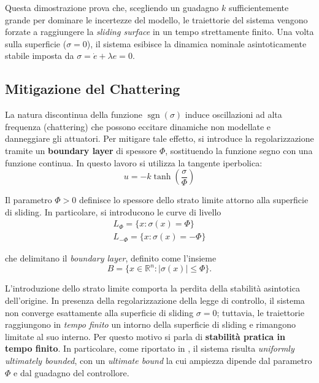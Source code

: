 Questa dimostrazione prova che, scegliendo un guadagno $k$ sufficientemente grande per dominare le incertezze del modello, le traiettorie del sistema vengono forzate a raggiungere la \textit{sliding surface} in un tempo strettamente finito. Una volta sulla superficie ($\sigma=0$), il sistema esibisce la dinamica nominale asintoticamente stabile imposta da $\sigma = \dot{e} + \lambda e = 0$.

\subsection{Mitigazione del Chattering}

La natura discontinua della funzione $\operatorname{sgn}(\sigma)$ induce oscillazioni ad alta frequenza (chattering) che possono eccitare dinamiche non modellate e danneggiare gli attuatori. Per mitigare tale effetto, si introduce la regolarizzazione tramite un \textbf{boundary layer} di spessore $\Phi$, sostituendo la funzione segno con una funzione continua. In questo lavoro si utilizza la tangente iperbolica:
\begin{equation}
u = -k \tanh\left(\frac{\sigma}{\Phi}\right)
\end{equation}

Il parametro $\Phi>0$ definisce lo spessore dello strato limite attorno alla superficie di sliding. In particolare, si introducono le curve di livello
\begin{equation}
\begin{matrix}
L_{\Phi} = \{x : \sigma(x) = \Phi\} \\
L_{-\Phi} = \{x : \sigma(x) = -\Phi\}
\end{matrix}
\end{equation}

che delimitano il \textit{boundary layer}, definito come l'insieme
\begin{equation}
B = \{x \in \mathbb{R}^n : |\sigma(x)| \le \Phi \}.
\end{equation}

L'introduzione dello strato limite comporta la perdita della stabilità asintotica dell'origine. In presenza della regolarizzazione della legge di controllo, il sistema non converge esattamente alla superficie di sliding $\sigma=0$; tuttavia, le traiettorie raggiungono in \textit{tempo finito} un intorno della superficie di sliding e rimangono limitate al suo interno. Per questo motivo si parla di \textbf{stabilità pratica in tempo finito}. In particolare, come riportato in \cite{khalil2002nonlinear}, il sistema risulta \textit{uniformly ultimately bounded}, con un \textit{ultimate bound} la cui ampiezza dipende dal parametro $\Phi$ e dal guadagno del controllore.

